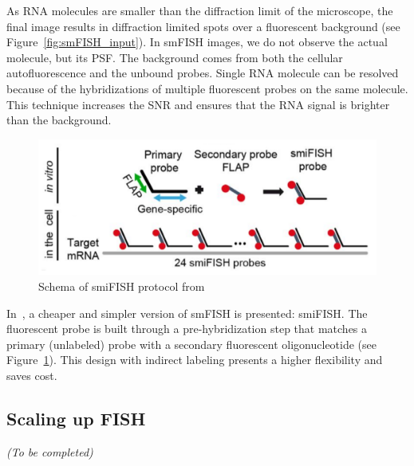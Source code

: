 \noindent
As \ac{RNA} molecules are smaller than the diffraction limit of the microscope, the final image results in diffraction limited spots over a fluorescent background (see Figure~\ref{fig:smFISH_input}).
In \ac{smFISH} images, we do not observe the actual molecule, but its \ac{PSF}.
The background comes from both the cellular autofluorescence and the unbound probes.
Single \ac{RNA} molecule can be resolved because of the hybridizations of multiple fluorescent probes on the same molecule.
This technique increases the \ac{SNR} and ensures that the \ac{RNA} signal is brighter than the background.

\begin{figure}
	\begin{center}
	\includegraphics[width=\linewidth]{figures/introduction/smiFISH}
	\caption[Schema of smiFISH protocol]{Schema of smiFISH protocol from~\cite{tsanov_smifish_2016}}
	\label{fig:smiFISH}
	\end{center}
\end{figure}

In~\cite{tsanov_smifish_2016}, a cheaper and simpler version of \ac{smFISH} is presented: \ac{smiFISH}.
The fluorescent probe is built through a pre-hybridization step that matches a primary (unlabeled) probe with a secondary fluorescent oligonucleotide (see Figure~\ref{fig:smiFISH}).
This design with indirect labeling presents a higher flexibility and saves cost.

\subsection{Scaling up FISH}
\label{subsec:intro_scale_fish}

\begin{center}
	\textit{(To be completed)}
\end{center}

